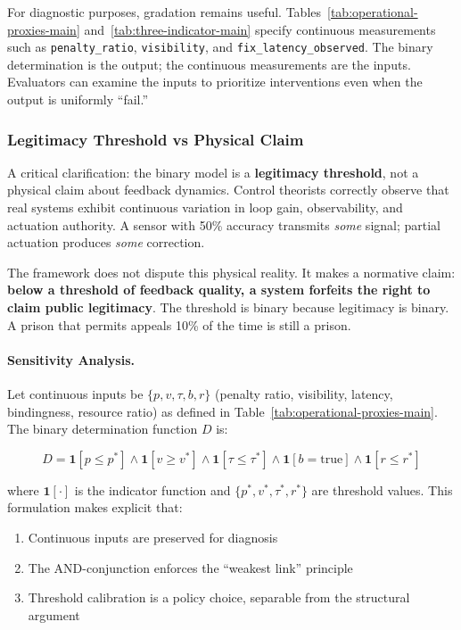 \documentclass{article}
\begin{document}
For diagnostic purposes, gradation remains useful. Tables~\ref{tab:operational-proxies-main} and~\ref{tab:three-indicator-main} specify continuous measurements such as \texttt{penalty\_ratio}, \texttt{visibility}, and \texttt{fix\_latency\_observed}. The binary determination is the output; the continuous measurements are the inputs. Evaluators can examine the inputs to prioritize interventions even when the output is uniformly ``fail.''

\subsubsection{Legitimacy Threshold vs Physical Claim}

A critical clarification: the binary model is a \textbf{legitimacy threshold}, not a physical claim about feedback dynamics. Control theorists correctly observe that real systems exhibit continuous variation in loop gain, observability, and actuation authority. A sensor with 50\% accuracy transmits \textit{some} signal; partial actuation produces \textit{some} correction.

The framework does not dispute this physical reality. It makes a normative claim: \textbf{below a threshold of feedback quality, a system forfeits the right to claim public legitimacy}. The threshold is binary because legitimacy is binary. A prison that permits appeals 10\% of the time is still a prison.

\paragraph{Sensitivity Analysis.} Let continuous inputs be $\{p, v, \tau, b, r\}$ (penalty ratio, visibility, latency, bindingness, resource ratio) as defined in Table~\ref{tab:operational-proxies-main}. The binary determination function $D$ is:

\begin{equation}
D = \mathbf{1}[p \leq p^*] \land \mathbf{1}[v \geq v^*] \land \mathbf{1}[\tau \leq \tau^*] \land \mathbf{1}[b = \text{true}] \land \mathbf{1}[r \leq r^*]
\end{equation}

where $\mathbf{1}[\cdot]$ is the indicator function and $\{p^*, v^*, \tau^*, r^*\}$ are threshold values. This formulation makes explicit that:
\begin{enumerate}[noitemsep]
    \item Continuous inputs are preserved for diagnosis
    \item The AND-conjunction enforces the ``weakest link'' principle
    \item Threshold calibration is a policy choice, separable from the structural argument
\end{enumerate}
\end{document}
